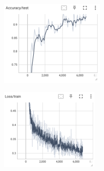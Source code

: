 \documentclass[12pt]{article}
\begin{document}
\begin{figure}[htbp]
	\centering
	\begin{minipage}{0.4\linewidth}
		\centering
		\includegraphics[width=0.9\linewidth]{./figures/2w1s_acc.png}
		\label{pic one}%
	\end{minipage}
	\begin{minipage}{0.4\linewidth}
		\centering
		\includegraphics[width=0.9\linewidth]{./figures/2w1s_train_loss.png}
		\label{pic two}%
	\end{minipage}
	\begin{minipage}{0.4\linewidth}
		\centering

\end{minipage}
\end{figure}
\end{document}
